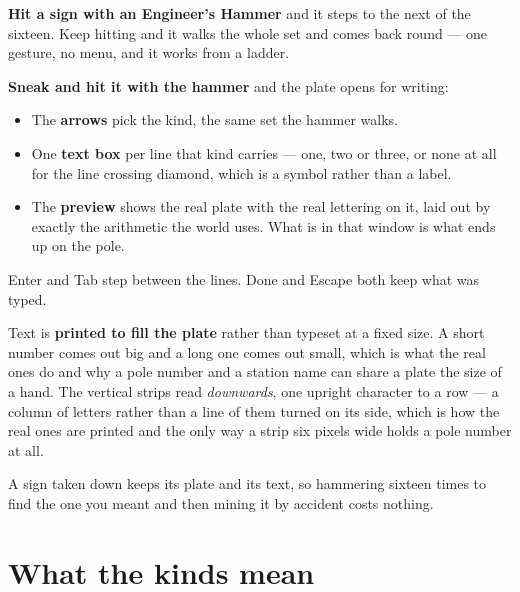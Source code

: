 \textbf{Hit a sign with an Engineer's Hammer} and it steps to the next of the sixteen. Keep hitting
and it walks the whole set and comes back round --- one gesture, no menu, and it works from a ladder.

\textbf{Sneak and hit it with the hammer} and the plate opens for writing:

\begin{itemize}
\item The \textbf{arrows} pick the kind, the same set the hammer walks.
\item One \textbf{text box} per line that kind carries --- one, two or three, or none at all for the
      line crossing diamond, which is a symbol rather than a label.
\item The \textbf{preview} shows the real plate with the real lettering on it, laid out by exactly
      the arithmetic the world uses. What is in that window is what ends up on the pole.
\end{itemize}

Enter and Tab step between the lines. Done and Escape both keep what was typed.

\begin{ietip}
Text is \textbf{printed to fill the plate} rather than typeset at a fixed size. A short number comes
out big and a long one comes out small, which is what the real ones do and why a pole number and a
station name can share a plate the size of a hand. The vertical strips read \emph{downwards}, one
upright character to a row --- a column of letters rather than a line of them turned on its side,
which is how the real ones are printed and the only way a strip six pixels wide holds a pole number
at all.
\end{ietip}

A sign taken down keeps its plate and its text, so hammering sixteen times to find the one you
meant and then mining it by accident costs nothing.

\section{What the kinds mean}

